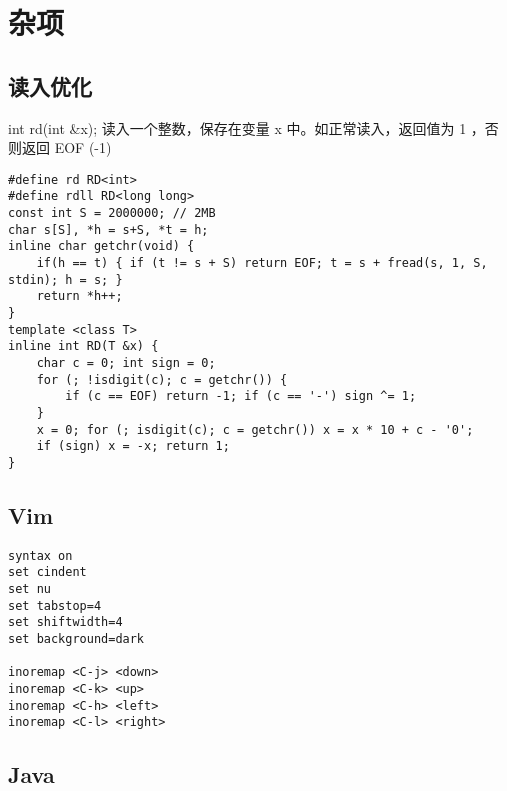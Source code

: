 \documentclass[landscape,a4paper]{article}
\begin{document}
\section{杂项}

\subsection{读入优化}

int rd(int \&x); 读入一个整数，保存在变量 x 中。如正常读入，返回值为 1 ，否则返回 EOF (-1)

\begin{lstlisting}
#define rd RD<int>
#define rdll RD<long long>
const int S = 2000000; // 2MB
char s[S], *h = s+S, *t = h;
inline char getchr(void) {
	if(h == t) { if (t != s + S) return EOF; t = s + fread(s, 1, S, stdin); h = s; }
	return *h++;
}
template <class T>
inline int RD(T &x) {
	char c = 0; int sign = 0;
	for (; !isdigit(c); c = getchr()) {
		if (c == EOF) return -1; if (c == '-') sign ^= 1;
	}
	x = 0; for (; isdigit(c); c = getchr()) x = x * 10 + c - '0';
	if (sign) x = -x; return 1;
}
\end{lstlisting}

\subsection{Vim}

\begin{lstlisting}
syntax on
set cindent
set nu
set tabstop=4
set shiftwidth=4
set background=dark

inoremap <C-j> <down>
inoremap <C-k> <up>
inoremap <C-h> <left>
inoremap <C-l> <right>
\end{lstlisting}

\subsection{Java}
\end{document}
